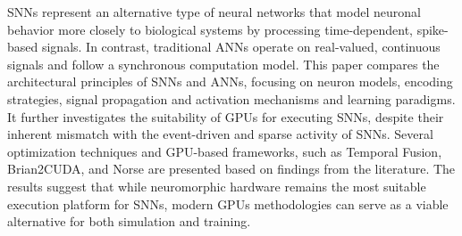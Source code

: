 \acp{SNN} represent an alternative type of neural networks that model neuronal behavior more closely to biological systems by processing time-dependent, spike-based signals.
In contrast, traditional \acp{ANN} operate on real-valued, continuous signals and follow a synchronous computation model.
This paper compares the architectural principles of \acp{SNN} and \acp{ANN}, focusing on neuron models, encoding strategies, signal propagation and activation mechanisms and learning paradigms.
It further investigates the suitability of \acp{GPU} for executing \acp{SNN}, despite their inherent mismatch with the event-driven and sparse activity of \acp{SNN}.
Several optimization techniques and \ac{GPU}-based frameworks, such as Temporal Fusion, Brian2CUDA, and Norse are presented based on findings from the literature.
The results suggest that while neuromorphic hardware remains the most suitable execution platform for \acp{SNN}, modern \acp{GPU} methodologies can serve as a viable alternative for both simulation and training.